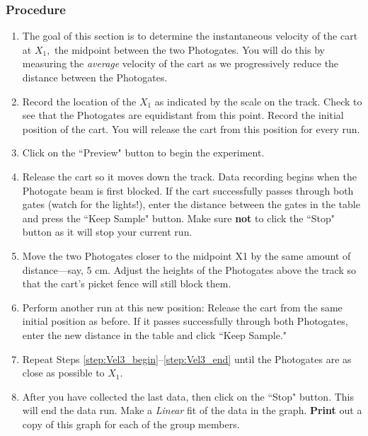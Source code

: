 \documentclass[main.tex]{subfiles}
\begin{document}
\subsubsection*{Procedure}
\begin{enumerate}
\item
The goal of this section is to determine the instantaneous velocity of the cart at $X_1,$ the midpoint between the two Photogates. You will do this by measuring the \emph{average} velocity of the cart as we progressively reduce the distance between the Photogates.
\item
Record the location of the $X_1$ as indicated by the scale on the track. Check to see that the Photogates are equidistant from this point. Record the initial position of the cart. You will release the cart from this position for every run.
\item
Click on the ``Preview" button to begin the experiment.
\item
Release the cart so it moves down the track. Data recording begins when the Photogate beam is first blocked. If the cart successfully passes through both gates (watch for the lights!), enter the distance between the gates in the table and press the ``Keep Sample" button. Make sure \textbf{not} to click the ``Stop" button as it will stop your current run.
\item \label{step:Vel3_begin}
Move the two Photogates closer to the midpoint X1 by the same amount of distance---say, 5 cm. Adjust the heights of the Photogates above the track so that the cart's picket fence will still block them.
\item \label{step:Vel3_end}
Perform another run at this new position: Release the cart from the same initial position as before. If it passes successfully through both Photogates, enter the new distance in the table and click ``Keep Sample."
\item
Repeat Steps \ref{step:Vel3_begin}--\ref{step:Vel3_end} until the Photogates are as close as possible to $X_1.$
\item
After you have collected the last data, then click on the ``Stop" button. This will end the data run. Make a \emph{Linear} fit of the data in the graph. \textbf{Print} out a copy of this graph for each of the group members.
\end{enumerate}
\end{document}
